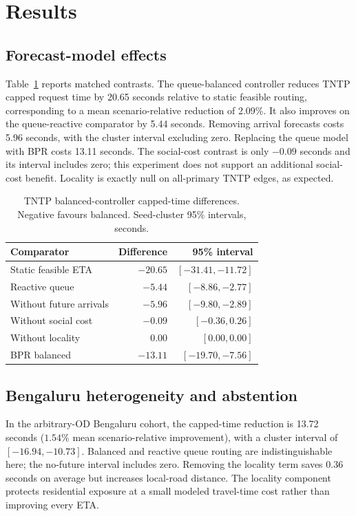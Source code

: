 \documentclass[sigconf,anonymous,review]{acmart}
\begin{document}
\section{Results}
\subsection{Forecast-model effects}
Table~\ref{tab:contrasts} reports matched contrasts. The queue-balanced controller reduces TNTP capped request time by 20.65 seconds relative to static feasible routing, corresponding to a mean scenario-relative reduction of 2.09\%. It also improves on the queue-reactive comparator by 5.44 seconds. Removing arrival forecasts costs 5.96 seconds, with the cluster interval excluding zero. Replacing the queue model with BPR costs 13.11 seconds. The social-cost contrast is only $-0.09$ seconds and its interval includes zero; this experiment does not support an additional social-cost benefit. Locality is exactly null on all-primary TNTP edges, as expected.

\begin{table}[t]
\caption{TNTP balanced-controller capped-time differences. Negative favours balanced. Seed-cluster 95\% intervals, seconds.}
\label{tab:contrasts}
\centering\small
\begin{tabular}{lrr}\toprule
Comparator & Difference & 95\% interval\\\midrule
Static feasible ETA & $-20.65$ & $[-31.41,-11.72]$\\
Reactive queue & $-5.44$ & $[-8.86,-2.77]$\\
Without future arrivals & $-5.96$ & $[-9.80,-2.89]$\\
Without social cost & $-0.09$ & $[-0.36,0.26]$\\
Without locality & $0.00$ & $[0.00,0.00]$\\
BPR balanced & $-13.11$ & $[-19.70,-7.56]$\\\bottomrule
\end{tabular}
\end{table}

\subsection{Bengaluru heterogeneity and abstention}
In the arbitrary-OD Bengaluru cohort, the capped-time reduction is 13.72 seconds ($1.54\%$ mean scenario-relative improvement), with a cluster interval of $[-16.94,-10.73]$. Balanced and reactive queue routing are indistinguishable here; the no-future interval includes zero. Removing the locality term saves 0.36 seconds on average but increases local-road distance. The locality component protects residential exposure at a small modeled travel-time cost rather than improving every ETA.
\end{document}
